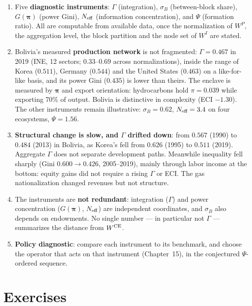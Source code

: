 \documentclass[../structural_economics_book.tex]{subfiles}
\begin{document}
\begin{enumerate}
\item Five \textbf{diagnostic instruments}: $\Gamma$ (integration), $\sigma_B$ (between-block share), $G(\boldsymbol{\pi})$ (power Gini), $N_{\text{eff}}$ (information concentration), and $\Psi$ (formation ratio). All are computable from available data, once the normalization of $W^P$, the aggregation level, the block partition and the node set of $W^I$ are stated.

\item Bolivia's measured \textbf{production network} is not fragmented: $\Gamma = 0.467$ in 2019 (INE, 12 sectors; $0.33$--$0.69$ across normalizations), inside the range of Korea ($0.511$), Germany ($0.544$) and the United States ($0.463$) on a like-for-like basis, and its power Gini ($0.435$) is lower than theirs. The enclave is measured by $\boldsymbol{\pi}$ and export orientation: hydrocarbons hold $\pi = 0.039$ while exporting 70\% of output. Bolivia is distinctive in complexity (ECI $-1.30$). The other instruments remain illustrative: $\sigma_B = 0.62$, $N_{\text{eff}} = 3.4$ on four ecosystems, $\Psi = 1.56$.

\item \textbf{Structural change is slow, and $\Gamma$ drifted down}: from $0.567$ (1990) to $0.484$ (2013) in Bolivia, as Korea's fell from $0.626$ (1995) to $0.511$ (2019). Aggregate $\Gamma$ does not separate development paths. Meanwhile inequality fell sharply (Gini $0.600 \to 0.426$, 2005--2019), mainly through labor income at the bottom: equity gains did not require a rising $\Gamma$ or ECI. The gas nationalization changed revenues but not structure.

\item The instruments are \textbf{not redundant}: integration ($\Gamma$) and power concentration ($G(\boldsymbol{\pi})$, $N_{\text{eff}}$) are independent coordinates, and $\sigma_B$ also depends on endowments. No single number --- in particular not $\Gamma$ --- summarizes the distance from $W^{\text{CE}}$.

\item \textbf{Policy diagnostic}: compare each instrument to its benchmark, and choose the operator that acts on that instrument (Chapter~15), in the conjectured $\Psi$-ordered sequence.
\end{enumerate}


\section{Exercises}
\label{ch17:sec:exercises}
\end{document}
